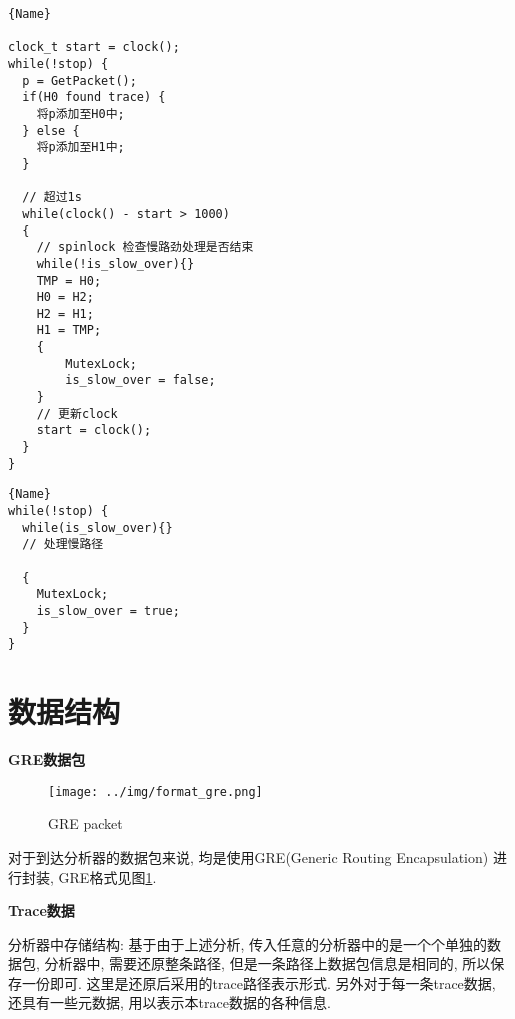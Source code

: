 \noindent\begin{minipage}{.55\textwidth}
\begin{lstlisting}[caption=快路径线程,frame=tlrb]{Name}

clock_t start = clock();
while(!stop) {
  p = GetPacket();
  if(H0 found trace) {
    将p添加至H0中;
  } else {
    将p添加至H1中;
  }

  // 超过1s
  while(clock() - start > 1000)
  {
    // spinlock 检查慢路劲处理是否结束
    while(!is_slow_over){}
    TMP = H0;
    H0 = H2;
    H2 = H1;
    H1 = TMP;
    {
        MutexLock;
        is_slow_over = false;
    }
    // 更新clock
    start = clock();
  }
}
\end{lstlisting}
\end{minipage}\hfill
\begin{minipage}{.38\textwidth}
\begin{lstlisting}[caption=慢路径线程,frame=tlrb]{Name}
while(!stop) {
  while(is_slow_over){}
  // 处理慢路径

  {
    MutexLock;
    is_slow_over = true;
  }
}
\end{lstlisting}
\end{minipage}



\section{数据结构}
\label{chap:数据结构}

\textbf{GRE数据包}

\begin{figure}[htbp!]
  \centering 
  \texttt{[image: ../img/format\_gre.png]}
  \caption{GRE packet}
  \label{fig:gre_packet}
\end{figure}

对于到达分析器的数据包来说, 均是使用GRE(Generic Routing Encapsulation)
进行封装, GRE格式见图\ref{fig:gre_packet}.

\textbf{Trace数据}

分析器中存储结构: 基于由于上述分析,
传入任意的分析器中的是一个个单独的数据包, 分析器中, 需要还原整条路径,
但是一条路径上数据包信息是相同的, 所以保存一份即可.
这里是还原后采用的trace路径表示形式. 另外对于每一条trace数据,
还具有一些元数据, 用以表示本trace数据的各种信息.

